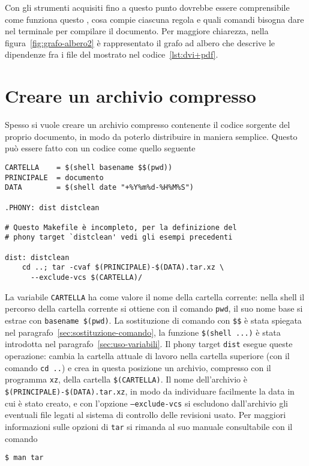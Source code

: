 Con gli strumenti acquisiti fino a questo punto dovrebbe essere comprensibile
come funziona questo , cosa compie ciascuna regola e quali
comandi bisogna dare nel terminale per compilare il documento.  Per maggiore
chiarezza, nella figura~\ref{fig:grafo-albero2} è rappresentato il grafo ad
albero che descrive le dipendenze fra i file del  mostrato
nel codice~\ref{lst:dvi+pdf}.

\section{Creare un archivio compresso}
\label{sec:creare-archivio}

Spesso si vuole creare un archivio compresso contenente il codice sorgente del
proprio documento, in modo da poterlo distribuire in maniera semplice.  Questo
può essere fatto con un codice come quello seguente
\begin{lstlisting}
CARTELLA	= $(shell basename $$(pwd))
PRINCIPALE	= documento
DATA		= $(shell date "+%Y%m%d-%H%M%S")

.PHONY: dist distclean

# Questo Makefile è incompleto, per la definizione del
# phony target `distclean' vedi gli esempi precedenti

dist: distclean
	cd ..; tar -cvaf $(PRINCIPALE)-$(DATA).tar.xz \
	  --exclude-vcs $(CARTELLA)/
\end{lstlisting} %
La variabile \texttt{CARTELLA} ha come valore il nome della cartella corrente:
nella shell il percorso della cartella corrente si ottiene con il comando
\texttt{pwd}, il suo nome base si estrae con \texttt{basename \$(pwd)}.  La
sostituzione di comando con \texttt{\$\$} è stata spiegata nel
paragrafo~\ref{sec:sostituzione-comando}, la funzione \texttt{\$(shell ...)} è
stata introdotta nel paragrafo~\ref{sec:uso-variabili}.  Il phony target
\texttt{dist} esegue queste operazione: cambia la cartella attuale di lavoro
nella cartella superiore (con il comando \texttt{cd ..}) e crea in questa
posizione un archivio, compresso con il programma \texttt{xz}, della cartella
\texttt{\$(CARTELLA)}.  Il nome dell'archivio è
\texttt{\$(PRINCIPALE)-\$(DATA).tar.xz}, in modo da individuare facilmente la
data in cui è stato creato, e con l'opzione \texttt{--exclude-vcs} si escludono
dall'archivio gli eventuali file legati al sistema di controllo delle revisioni
usato.  Per maggiori informazioni sulle opzioni di \texttt{tar} si rimanda al
suo manuale consultabile con il comando
\begin{verbatim}
$ man tar
\end{verbatim}

